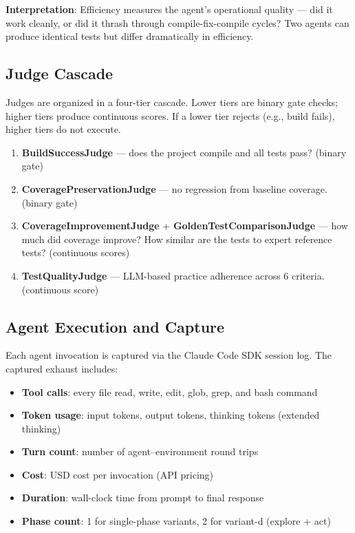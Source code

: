 \documentclass[11pt,a4paper]{article}
\begin{document}
\textbf{Interpretation}: Efficiency measures the agent's operational quality ---
did it work cleanly, or did it thrash through compile-fix-compile cycles?
Two agents can produce identical tests but differ dramatically in efficiency.

\subsection{Judge Cascade}

Judges are organized in a four-tier cascade. Lower tiers are binary gate checks;
higher tiers produce continuous scores. If a lower tier rejects (e.g., build fails),
higher tiers do not execute.

\begin{enumerate}[label=\textbf{Tier \arabic*:}, leftmargin=3cm]
  \item[Tier 0:] \textbf{BuildSuccessJudge} --- does the project compile and all tests pass? (binary gate)
  \item[Tier 1:] \textbf{CoveragePreservationJudge} --- no regression from baseline coverage. (binary gate)
  \item[Tier 2:] \textbf{CoverageImprovementJudge} + \textbf{GoldenTestComparisonJudge} --- how much did coverage improve? How similar are the tests to expert reference tests? (continuous scores)
  \item[Tier 3:] \textbf{TestQualityJudge} --- LLM-based practice adherence across 6 criteria. (continuous score)
\end{enumerate}

\subsection{Agent Execution and Capture}

Each agent invocation is captured via the Claude Code SDK session log.
The captured exhaust includes:

\begin{itemize}
  \item \textbf{Tool calls}: every file read, write, edit, glob, grep, and bash command
  \item \textbf{Token usage}: input tokens, output tokens, thinking tokens (extended thinking)
  \item \textbf{Turn count}: number of agent--environment round trips
  \item \textbf{Cost}: USD cost per invocation (API pricing)
  \item \textbf{Duration}: wall-clock time from prompt to final response
  \item \textbf{Phase count}: 1 for single-phase variants, 2 for variant-d (explore + act)
\end{itemize}
\end{document}
